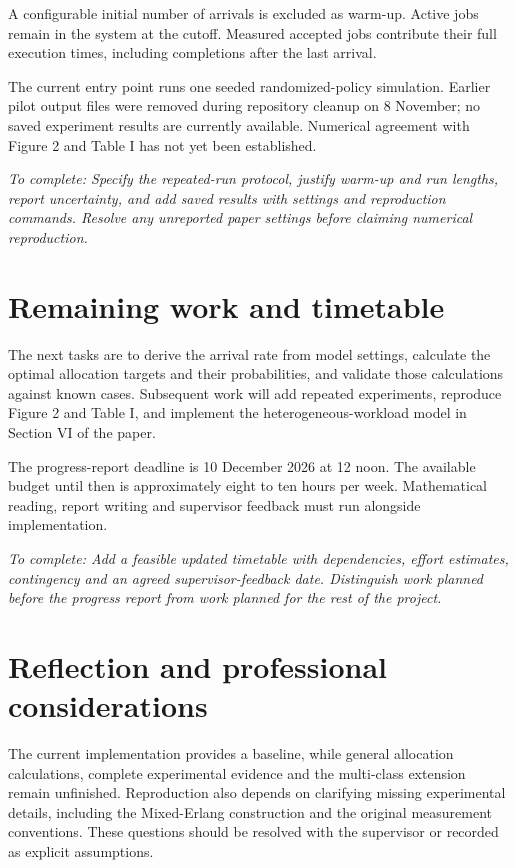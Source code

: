 \documentclass[11pt,a4paper,oneside]{article}
\newcommand{\draftnote}[1]{\par\textit{To complete: #1}\par}
\begin{document}
A configurable initial number of arrivals is excluded as warm-up. Active jobs
remain in the system at the cutoff. Measured accepted jobs contribute their full
execution times, including completions after the last arrival.

The current entry point runs one seeded randomized-policy simulation. Earlier pilot output
files were removed during repository cleanup on 8 November; no saved experiment
results are currently available. Numerical agreement with Figure 2 and Table I
has not yet been established.

\draftnote{Specify the repeated-run protocol, justify warm-up and run lengths,
report uncertainty, and add saved results with settings and reproduction commands.
Resolve any unreported paper settings before claiming numerical reproduction.}

\section{Remaining work and timetable}

The next tasks are to derive the arrival rate from model settings, calculate the
optimal allocation targets and their probabilities, and validate those
calculations against known cases. Subsequent work will add repeated experiments,
reproduce Figure 2 and Table I, and implement the heterogeneous-workload model
in Section VI of the paper.

The progress-report deadline is 10 December 2026 at 12 noon. The available budget
until then is approximately eight to ten hours per week. Mathematical reading,
report writing and supervisor feedback must run alongside implementation.

\draftnote{Add a feasible updated timetable with dependencies, effort estimates,
contingency and an agreed supervisor-feedback date. Distinguish work planned
before the progress report from work planned for the rest of the project.}

\section{Reflection and professional considerations}

The current implementation provides a baseline, while general allocation
calculations, complete experimental evidence and the multi-class extension remain
unfinished. Reproduction also depends on clarifying missing experimental details,
including the Mixed-Erlang construction and the original measurement conventions.
These questions should be resolved with the supervisor or recorded as explicit
assumptions.
\end{document}
